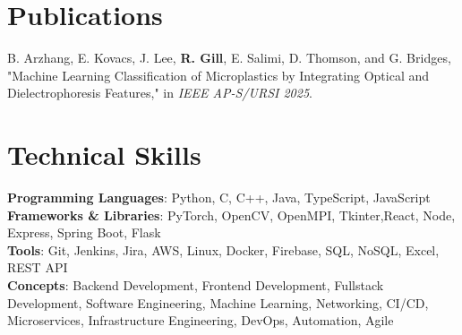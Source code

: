 \documentclass[letterpaper,11pt]{article}
\begin{document}
\section{Publications}
\begin{itemize}[leftmargin=0.15in, label={}]
  \small{\item{
    B. Arzhang, E. Kovacs, J. Lee, \textbf{R. Gill}, E. Salimi, D. Thomson, and G. Bridges, "Machine Learning Classification of Microplastics by Integrating Optical and Dielectrophoresis Features," in \textit{IEEE AP-S/URSI 2025}. \\
  }}
\end{itemize}



\section{Technical Skills}
 \begin{itemize}[leftmargin=0.15in, label={}]
    \small{\item{
    \textbf{Programming Languages}{: Python, C, C++, Java, TypeScript, JavaScript} \\
    \textbf{Frameworks \& Libraries}{: PyTorch, OpenCV, OpenMPI, Tkinter,React, Node, Express, Spring Boot, Flask} \\
    \textbf{Tools}{: Git, Jenkins, Jira, AWS, Linux, Docker, Firebase, SQL, NoSQL, Excel, REST API} \\
    \textbf{Concepts}{: Backend Development, Frontend Development, Fullstack Development, Software Engineering, Machine Learning, Networking, CI/CD, Microservices, Infrastructure Engineering, DevOps, Automation, Agile} \\
    }}
 \end{itemize}


\end{document}
